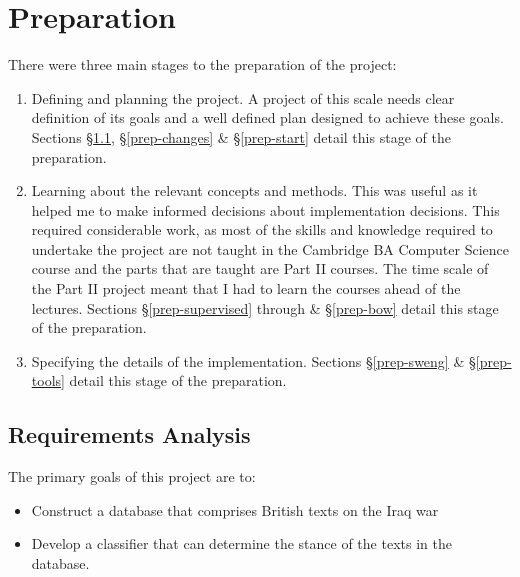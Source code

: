 \documentclass[12pt,a4paper,twoside,openright]{report}
\begin{document}
\chapter{Preparation} \label{prep}


There were three main stages to the preparation of the project:
\begin{enumerate}
	\item Defining and planning the project. A project of this scale needs clear definition of its goals and a well defined plan designed to achieve these goals. Sections \S\ref{prep-requirements}, \S\ref{prep-changes} \& \S\ref{prep-start} detail this stage of the preparation.

	\item Learning about the relevant concepts and methods. This was useful as it helped me to make informed decisions about implementation decisions. This required considerable work, as most of the skills and knowledge required to undertake the project are not taught in the Cambridge BA Computer Science course and the parts that are taught are Part II courses. The time scale of the Part II project meant that I had to learn the courses ahead of the lectures. Sections \S\ref{prep-supervised} through \& \S\ref{prep-bow} detail this stage of the preparation.
	
	\item Specifying the details of the implementation. Sections \S\ref{prep-sweng} \& \S\ref{prep-tools} detail this stage of the preparation.
\end{enumerate}

\section{Requirements Analysis} \label{prep-requirements}
The primary goals of this project are to:
\begin{itemize}
	\item Construct a database that comprises British texts on the Iraq war
	\item Develop a classifier that can determine the stance of the texts in the database.
\end{itemize}
\end{document}
